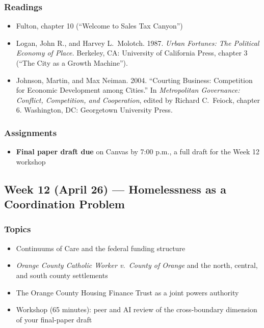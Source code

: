 \documentclass[12pt]{article}
\begin{document}
    \subsubsection*{Readings}
        \begin{itemize}
            \item Fulton, chapter 10 (``Welcome to Sales Tax Canyon'')
            \item Logan, John R., and Harvey L.\ Molotch. 1987. \emph{Urban Fortunes: The Political Economy of Place.} Berkeley, CA: University of California Press, chapter 3 (``The City as a Growth Machine'').
            \item Johnson, Martin, and Max Neiman. 2004. ``Courting Business: Competition for Economic Development among Cities.'' In \emph{Metropolitan Governance: Conflict, Competition, and Cooperation}, edited by Richard C.\ Feiock, chapter 6. Washington, DC: Georgetown University Press.
        \end{itemize}
    \subsubsection*{Assignments}
        \begin{itemize}
            \item \textbf{Final paper draft due} on Canvas by 7:00 p.m., a full draft for the Week 12 workshop
        \end{itemize}

\subsection*{Week 12 (April 26) --- Homelessness as a Coordination Problem}
    \subsubsection*{Topics}
        \begin{itemize}
            \item Continuums of Care and the federal funding structure
            \item \emph{Orange County Catholic Worker v.\ County of Orange} and the north, central, and south county settlements
            \item The Orange County Housing Finance Trust as a joint powers authority
            \item Workshop (65 minutes): peer and AI review of the cross-boundary dimension of your final-paper draft
        \end{itemize}
\end{document}
